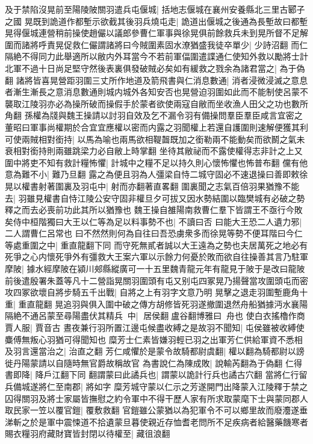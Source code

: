及于禁陷沒晃前至陽陵陂關羽遣兵屯偃城|{
	括地志偃城在襄州安養縣北三里古郾子之國}
晃既到詭道作都塹示欲截其後羽兵燒屯走|{
	詭道出偃城之後通為長塹故曰都塹}
晃得偃城連營稍前操使趙儼以議郎參曹仁軍事與徐晃俱前餘救兵未到晃所督不足解圍而諸將呼責晃促救仁儼謂諸將曰今賊圍素固水潦猶盛我徒卒單少|{
	少詩沼翻}
而仁隔絶不得同力此舉適所以敝内外耳當今不若前軍偪圍遣諜通仁使知外救以勵將士計北軍不過十日尚足堅守然後表裏俱發破賊必矣如有緩救之戮余為諸君當之|{
	為于偽翻}
諸將皆喜晃營距羽圍三丈所作地道及箭飛書與仁消息數通|{
	消者浸微浸滅之意息者漸生漸長之意消息數通則城内城外各知安否也晃營迫羽圍如此而不能制使呂蒙不襲取江陵羽亦必為操所破而操假手於蒙者欲使兩寇自敝而坐收漁人田父之功也數所角翻}
孫權為牋與魏王操請以討羽自效及乞不漏令羽有備操問羣臣羣臣咸言宜密之董昭曰軍事尚權期於合宜宜應權以密而内露之羽聞權上若還自護圍則速解便獲其利可使兩賊相對銜持|{
	以馬為喻也兩馬欲相鞮齧既加之銜勒兩不能動矣而欲鬭之氣未衰相對銜持則兩雖跳梁力必自敝上時掌翻}
坐待其敝祕而不露使權得志非計之上又圍中將吏不知有救計糧怖懼|{
	計城中之糧不足以持久則心懷怖懼也怖普布翻}
儻有他意為難不小|{
	難乃旦翻}
露之為便且羽為人彊梁自恃二城守固必不速退操曰善即敕徐晃以權書射著圍裏及羽屯中|{
	射而亦翻著直畧翻}
圍裏聞之志氣百倍羽果猶豫不能去|{
	羽雖見權書自恃江陵公安守固非權旦夕可拔又因水勢結圍以臨樊城有必破之勢釋之而去必喪前功此其所以猶豫也}
魏王操自雒陽南救曹仁羣下皆謂王不亟行今敗矣侍中桓階獨曰大王以仁等為足以料事勢不也|{
	不讀曰否}
曰能大王恐二人遺力邪|{
	二人謂曹仁呂常也}
曰不然然則何為自往曰吾恐虜衆多而徐晃等勢不便耳階曰今仁等處重圍之中|{
	重直龍翻下同}
而守死無貳者誠以大王遠為之勢也夫居萬死之地必有死爭之心内懷死爭外有彊救大王案六軍以示餘力何憂於敗而欲自往操善其言乃駐軍摩陂|{
	據水經摩陂在潁川郟縣縱廣可一十五里魏青龍元年有龍見于陂于是改曰龍陂}
前後遣殷署朱蓋等凡十二營詣晃關羽圍頭有屯又别屯四冢晃乃揚聲當攻圍頭屯而密攻四冢欲壞自將步騎五千出戰|{
	自將之上有羽字文意乃明}
晃擊之退走羽圍塹鹿角十重|{
	重直龍翻}
晃追羽與俱入圍中破之傳方胡修皆死羽遂撤圍退然舟船猶據沔水襄陽隔絶不通呂蒙至尋陽盡伏其精兵中|{
	居侯翻盧谷翻博雅曰舟也}
使白衣搖櫓作商賈人服|{
	賈音古}
晝夜兼行羽所置江邊屯候盡收縛之是故羽不聞知|{
	屯侯雖被收縛使麋傅無叛心羽猶可得聞知也}
糜芳士仁素皆嫌羽輕已羽之出軍芳仁供給軍資不悉相及羽言還當治之|{
	治直之翻}
芳仁咸懼於是蒙令故騎都尉虞翻|{
	權以翻為騎都尉以謗徙丹陽蒙請以自隨時無官爵故稱故官}
為書說仁為陳成敗|{
	說輸芮翻為于偽翻}
仁得書即降|{
	降戶江翻下同}
翻謂蒙曰此譎兵也|{
	謂蒙以詭計行兵也譎古穴翻}
當將仁行留兵備城遂將仁至南郡|{
	將如字}
糜芳城守蒙以仁示之芳遂開門出降蒙入江陵釋于禁之囚得關羽及將士家屬皆撫慰之約令軍中不得干歷人家有所求取蒙麾下士與蒙同郡人取民家一笠以覆官鎧|{
	覆敷救翻}
官鎧雖公蒙猶以為犯軍令不可以鄉里故而廢灋遂垂涕斬之於是軍中震悚道不拾遺蒙旦暮使親近存恤耆老問所不足疾病者給醫藥饑寒者賜衣糧羽府藏財寶皆封閉以待權至|{
	藏徂浪翻}
